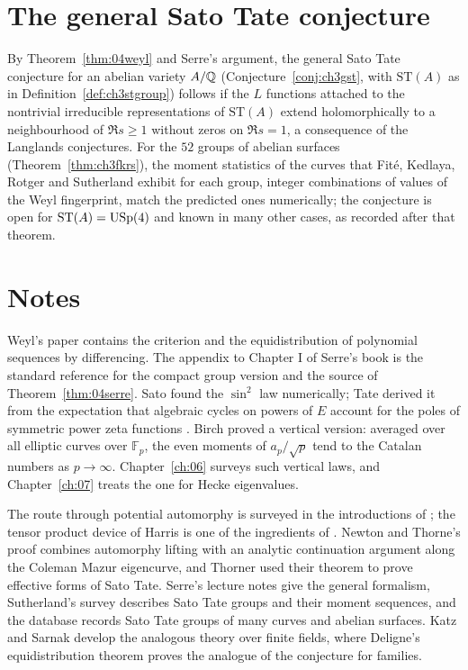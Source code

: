 \section{The general Sato Tate conjecture}

By Theorem~\ref{thm:04weyl} and Serre's argument, the general Sato Tate conjecture for an abelian variety $A/\mathbb{Q}$ (Conjecture~\ref{conj:ch3gst}, with $\mathrm{ST}(A)$ as in Definition~\ref{def:ch3stgroup}) follows if the $L$ functions attached to the nontrivial irreducible representations of $\mathrm{ST}(A)$ extend holomorphically to a neighbourhood of $\Re s \ge 1$ without zeros on $\Re s = 1$, a consequence of the Langlands conjectures. For the $52$ groups of abelian surfaces (Theorem~\ref{thm:ch3fkrs}), the moment statistics of the curves that Fit\'e, Kedlaya, Rotger and Sutherland \cite{fkrs2012} exhibit for each group, integer combinations of values of the Weyl fingerprint, match the predicted ones numerically; the conjecture is open for $\mathrm{ST}(A)=\mathrm{USp}(4)$ and known in many other cases, as recorded after that theorem.

\section{Notes}

Weyl's paper \cite{weyl1916} contains the criterion and the equidistribution of polynomial sequences by differencing. The appendix to Chapter I of Serre's book \cite{serre1968} is the standard reference for the compact group version and the source of Theorem~\ref{thm:04serre}. Sato found the $\sin^2$ law numerically; Tate derived it from the expectation that algebraic cycles on powers of $E$ account for the poles of symmetric power zeta functions \cite{tate1965}. Birch \cite{birch1968} proved a vertical version: averaged over all elliptic curves over $\mathbb{F}_p$, the even moments of $a_p/\sqrt p$ tend to the Catalan numbers as $p\to\infty$. Chapter~\ref{ch:06} surveys such vertical laws, and Chapter~\ref{ch:07} treats the one for Hecke eigenvalues.

The route through potential automorphy is surveyed in the introductions of \cite{hsbt2010,blght2011}; the tensor product device of Harris \cite{harris2009} is one of the ingredients of \cite{blght2011}. Newton and Thorne's proof \cite{newtonthorne2021,newtonthorne2021b} combines automorphy lifting with an analytic continuation argument along the Coleman Mazur eigencurve, and Thorner \cite{thorner2021} used their theorem to prove effective forms of Sato Tate. Serre's lecture notes \cite{serre2012} give the general formalism, Sutherland's survey \cite{sutherland2019} describes Sato Tate groups and their moment sequences, and the database \cite{lmfdb} records Sato Tate groups of many curves and abelian surfaces. Katz and Sarnak \cite{katzsarnak1999} develop the analogous theory over finite fields, where Deligne's equidistribution theorem \cite{deligne1980} proves the analogue of the conjecture for families.

